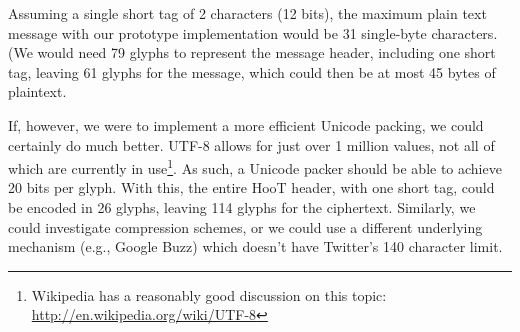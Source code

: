 Assuming a single short tag of 2 characters (12 bits), the maximum plain text message with our prototype implementation would be 31 single-byte characters. (We would need 79 glyphs to represent the message header, including one short tag, leaving 61 glyphs for the message, which could then be at most 45 bytes of plaintext.

If, however, we were to implement a more efficient Unicode packing, we could certainly do much better. UTF-8 allows for just over 1 million values, not all of which are currently in use\footnote{Wikipedia has a reasonably good discussion on this topic: \url{http://en.wikipedia.org/wiki/UTF-8}}. As such, a Unicode packer should be able to achieve 20 bits per glyph. With this, the entire HooT header, with one short tag, could be encoded in 26 glyphs, leaving 114 glyphs for the ciphertext. Similarly, we could investigate compression schemes, or we could use a different underlying mechanism (e.g., Google Buzz) which doesn't have Twitter's 140 character limit.
